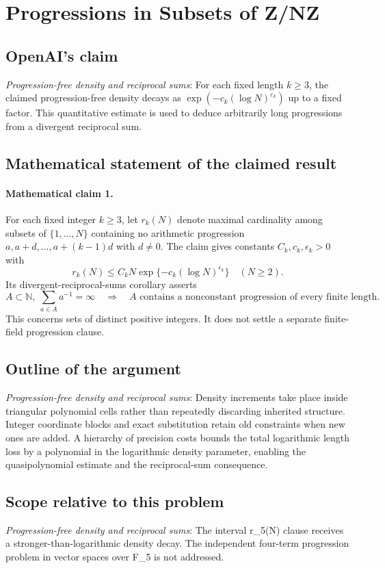 \documentclass[11pt]{article}
\begin{document}
\section*{Progressions in Subsets of Z/NZ}

\subsection{OpenAI's claim}
\textit{Progression-free density and reciprocal sums}: For each fixed length $k\ge3$, the claimed progression-free density decays as $\exp(-c_k(\log N)^{\varepsilon_k})$ up to a fixed factor. This quantitative estimate is used to deduce arbitrarily long progressions from a divergent reciprocal sum.

\subsection{Mathematical statement of the claimed result}
\paragraph{Mathematical claim 1.} For each fixed integer $k\ge3$, let $r_k(N)$ denote maximal cardinality among subsets of $\{1,\ldots,N\}$ containing no arithmetic progression $a,a+d,\ldots,a+(k-1)d$ with $d\ne0$. The claim gives constants $C_k,c_k,\epsilon_k>0$ with \[r_k(N)\le C_kN\exp\{-c_k(\log N)^{\epsilon_k}\}\quad(N\ge2).\] Its divergent-reciprocal-sums corollary asserts \[A\subset\mathbb N,\ \sum_{a\in A}a^{-1}=\infty\quad\Longrightarrow\quad A\text{ contains a nonconstant progression of every finite length}.\] This concerns sets of distinct positive integers. It does not settle a separate finite-field progression clause.

\subsection{Outline of the argument}
\textit{Progression-free density and reciprocal sums}: Density increments take place inside triangular polynomial cells rather than repeatedly discarding inherited structure. Integer coordinate blocks and exact substitution retain old constraints when new ones are added. A hierarchy of precision costs bounds the total logarithmic length loss by a polynomial in the logarithmic density parameter, enabling the quasipolynomial estimate and the reciprocal-sum consequence.

\subsection{Scope relative to this problem}
\textit{Progression-free density and reciprocal sums}: The interval r\_5(N) clause receives a stronger-than-logarithmic density decay. The independent four-term progression problem in vector spaces over F\_5 is not addressed.
\end{document}
